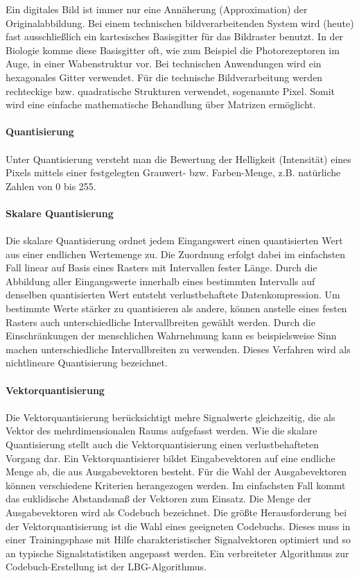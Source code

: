 Ein digitales Bild ist immer nur eine Annäherung (Approximation) der Originalabbildung.
Bei einem technischen bildverarbeitenden System wird  (heute) fast ausschließlich ein
kartesisches Basisgitter für das Bildraster benutzt. In der Biologie komme diese Basisgitter oft, wie zum Beispiel die Photorezeptoren im Auge, in einer Wabenstruktur vor. Bei technischen Anwendungen wird ein hexagonales Gitter verwendet.
 Für die technische Bildverarbeitung werden rechteckige bzw. quadratische Strukturen verwendet, sogenannte Pixel. Somit wird eine einfache mathematische Behandlung über Matrizen ermöglicht.
 \\
 \\
\textbf{Quantisierung}
\\
\\
Unter Quantisierung versteht man die Bewertung der Helligkeit (Intensität) eines Pixels mittels einer
festgelegten Grauwert- bzw. Farben-Menge, z.B. natürliche Zahlen von 0 bis 255.
\\
 \\
 \textbf{Skalare Quantisierung} 
 \\
 \\
Die skalare Quantisierung ordnet jedem Eingangswert einen quantisierten Wert aus einer endlichen Wertemenge zu. Die Zuordnung erfolgt dabei im einfachsten Fall linear auf Basis eines Rasters mit 
Intervallen fester Länge. Durch die Abbildung aller Eingangswerte innerhalb eines bestimmten Intervalls auf denselben quantisierten Wert entsteht verlustbehaftete Datenkompression. Um bestimmte Werte stärker zu quantisieren als andere, können anstelle eines festen Rasters auch unterschiedliche Intervallbreiten gewählt werden. Durch die Einschränkungen der menschlichen Wahrnehmung kann es beispielsweise Sinn machen unterschiedliche Intervallbreiten zu verwenden. Dieses Verfahren wird als nichtlineare Quantisierung bezeichnet. 
\\
\\
\textbf{Vektorquantisierung}
\\
\\
Die Vektorquantisierung berücksichtigt mehre Signalwerte gleichzeitig, die als Vektor des mehrdimensionalen Raums aufgefasst werden. Wie die skalare Quantisierung stellt auch die Vektorquantisierung einen verlustbehafteten Vorgang dar. Ein Vektorquantisierer bildet Eingabevektoren auf eine endliche Menge ab, die aus Ausgabevektoren besteht. Für die Wahl der Ausgabevektoren können verschiedene Kriterien herangezogen werden. Im einfachsten Fall kommt das euklidische Abstandsmaß der Vektoren zum Einsatz. Die Menge der Ausgabevektoren wird als Codebuch bezeichnet. Die größte Herausforderung bei der Vektorquantisierung ist die Wahl eines geeigneten Codebuchs. Dieses muss in einer Trainingsphase mit Hilfe charakteristischer Signalvektoren optimiert und so an typische Signalstatistiken angepasst werden. Ein verbreiteter Algorithmus zur Codebuch-Erstellung ist der LBG-Algorithmus. 
